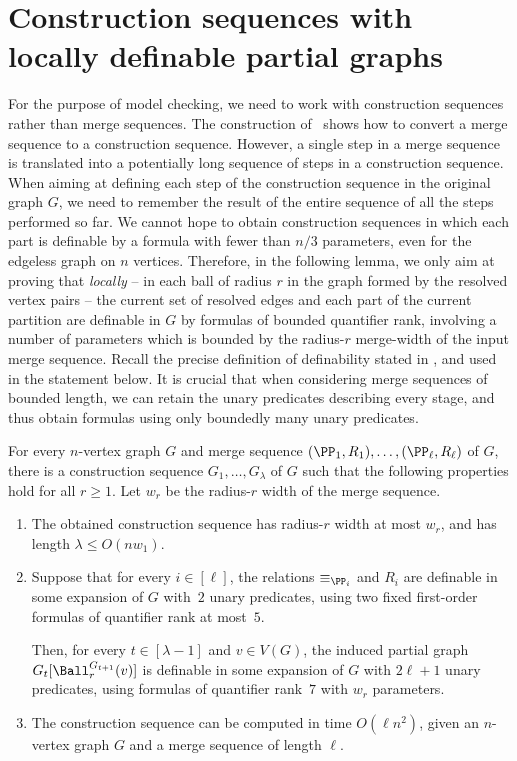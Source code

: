 \section{Construction sequences with locally definable partial graphs}\label{sec:construction-sequences}

For the purpose of model checking,
we need to work with construction sequences rather than merge sequences.
The construction of~\cite[Lemma~3.3]{mw-arxiv} shows how to convert a merge sequence to a construction sequence. However, a single step in a merge sequence is translated into a potentially long sequence of steps in a construction sequence. When aiming at defining each step of the construction sequence in the original graph $G$, we need to remember the result of the entire sequence of all the steps performed so far.
We cannot hope to obtain construction sequences in which each part is definable by a formula with fewer than $n/3$ parameters, even for the edgeless graph on $n$ vertices.
Therefore, in the following lemma, we only aim at proving that \emph{locally} -- in each ball of radius $r$ in the graph formed by the resolved vertex pairs -- the current set of resolved edges and each part of the current partition are definable in $G$ by formulas of bounded quantifier rank, involving a number of parameters which is bounded by the radius-$r$ merge-width of the input merge sequence. Recall the precise definition
of definability stated in , and used in the statement below.
It is crucial that when considering merge sequences of bounded length, we
can retain the unary predicates describing every stage, and thus obtain formulas using only boundedly many unary predicates.

\begin{lemma}\label{cl:from-merge-to-construction}
    For every $n$-vertex graph $G$ and merge sequence $(\PP_1,R_1),\ldots,(\PP_\ell,R_\ell)$ of $G$, there is a construction sequence $G_1,\ldots,G_\lambda$ of $G$ such that the following properties hold for all $r\ge 1$.
    Let $w_r$ be the radius-$r$ width of the merge sequence.
    \begin{enumerate}
        \item The obtained construction sequence has radius-$r$ width at most $w_r$, and has length $\lambda\le O(nw_1)$.
        \item Suppose that for every $i\in[\ell]$, the relations $\equiv_{\PP_i}$ and $R_i$ are definable in some expansion of $G$ with~$2$ unary predicates, using two fixed first-order formulas of quantifier rank at most~$5$.

        Then, for every $t\in[\lambda-1]$ and  $v\in V(G)$, the induced partial graph
        $G_t[\Ball^{G_{t+1}}_r(v)]$ is definable in some expansion of $G$
        with $2\ell+1$ unary predicates, using formulas of quantifier rank~$7$ with $w_r$
        parameters.

        \item  The construction sequence can be
computed in time $O(\ell n^2)$, given an $n$-vertex graph $G$ and a merge sequence of length $\ell$.    \end{enumerate}
    \end{lemma}

